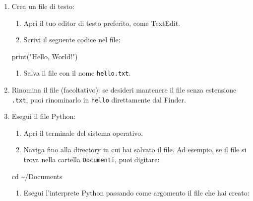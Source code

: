 \documentclass[
  letterpaper,
]{scrbook}
\newenvironment{Shaded}{\begin{snugshade}}{\end{snugshade}}
\newcommand{\BuiltInTok}[1]{\textcolor[rgb]{0.00,0.23,0.31}{#1}}
\newcommand{\NormalTok}[1]{\textcolor[rgb]{0.00,0.23,0.31}{#1}}
\newcommand{\StringTok}[1]{\textcolor[rgb]{0.13,0.47,0.30}{#1}}
\providecommand{\tightlist}{%
  \setlength{\itemsep}{0pt}\setlength{\parskip}{0pt}}\usepackage{longtable,booktabs,array}
\begin{document}
\begin{enumerate}
\def\labelenumi{\arabic{enumi}.}
\item
  Crea un file di testo:

  \begin{enumerate}
  \def\labelenumii{\arabic{enumii}.}
  \tightlist
  \item
    Apri il tuo editor di testo preferito, come TextEdit.
  \item
    Scrivi il seguente codice nel file:
  \end{enumerate}

\begin{Shaded}
\begin{Highlighting}[]
\BuiltInTok{print}\NormalTok{(}\StringTok{"Hello, World!"}\NormalTok{)}
\end{Highlighting}
\end{Shaded}

  \begin{enumerate}
  \def\labelenumii{\arabic{enumii}.}
  \setcounter{enumii}{2}
  \tightlist
  \item
    Salva il file con il nome \texttt{hello.txt}.
  \end{enumerate}
\item
  Rinomina il file (facoltativo): se desideri mantenere il file senza
  estensione \texttt{.txt}, puoi rinominarlo in \texttt{hello}
  direttamente dal Finder.
\item
  Esegui il file Python:

  \begin{enumerate}
  \def\labelenumii{\arabic{enumii}.}
  \tightlist
  \item
    Apri il terminale del sistema operativo.
  \item
    Naviga fino alla directory in cui hai salvato il file. Ad esempio,
    se il file si trova nella cartella \texttt{Documenti}, puoi
    digitare:
  \end{enumerate}

\begin{Shaded}
\begin{Highlighting}[]
\BuiltInTok{cd}\NormalTok{ \textasciitilde{}/Documents}
\end{Highlighting}
\end{Shaded}

  \begin{enumerate}
  \def\labelenumii{\arabic{enumii}.}
  \setcounter{enumii}{2}
  \tightlist
  \item
    Esegui l'interprete Python passando come argomento il file che hai
    creato:
  \end{enumerate}


\end{enumerate}
\end{document}

